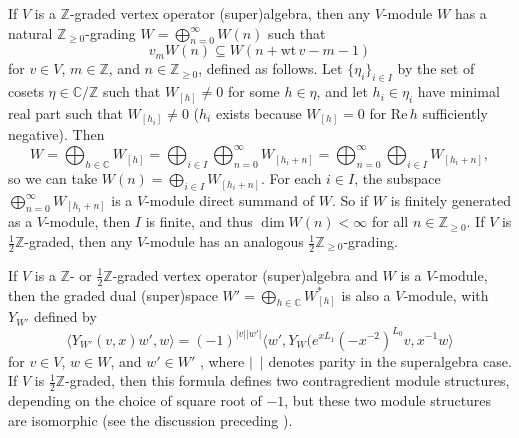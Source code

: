 \documentclass[11pt, reqno]{amsart}
\theoremstyle{definition}\newtheorem{defi}[thm]{Definition}
\theoremstyle{definition}\newtheorem{rem}[thm]{Remark}
\theoremstyle{definition}\newtheorem{exam}[thm]{Example}
\theoremstyle{definition}\newtheorem{assum}[thm]{Assumption}
\newcommand{\CC}{\mathbb{C}}
\newcommand{\ZZ}{\mathbb{Z}}
\begin{document}
If $V$ is a $\ZZ$-graded vertex operator (super)algebra, then any $V$-module $W$ has a natural $\ZZ_{\geq 0}$-grading $W=\bigoplus_{n=0}^\infty W(n)$ such that
\begin{equation*}
v_m W(n)\subseteq W(n+\mathrm{wt}\,v-m-1)
\end{equation*}
for $v\in V$, $m\in\ZZ$, and $n\in\ZZ_{\geq 0}$, defined as follows. Let $\lbrace\eta_i\rbrace_{i\in I}$ by the set of cosets $\eta\in\CC/\ZZ$ such that $W_{[h]}\neq 0$ for some $h\in\eta$, and let $h_i\in\eta_i$ have minimal real part such that $W_{[h_i]}\neq 0$ ($h_i$ exists because $W_{[h]}=0$ for $\mathrm{Re}\,h$ sufficiently negative). Then
\begin{equation*}
W=\bigoplus_{h\in\CC} W_{[h]} =\bigoplus_{i\in I}\bigoplus_{n=0}^\infty W_{[h_i+n]} =\bigoplus_{n=0}^\infty\bigoplus_{i\in I} W_{[h_i+n]},
\end{equation*}
so we can take $W(n)=\bigoplus_{i\in I} W_{[h_i+n]}$. For each $i\in I$, the subspace $\bigoplus_{n=0}^\infty W_{[h_i+n]}$ is a $V$-module direct summand of $W$. So if $W$ is finitely generated as a $V$-module, then $I$ is finite, and thus $\dim W(n)<\infty$ for all $n\in\ZZ_{\geq 0}$. If $V$ is $\frac{1}{2}\ZZ$-graded, then any $V$-module has an analogous $\frac{1}{2}\ZZ_{\geq 0}$-grading.

If $V$ is a $\ZZ$- or $\frac{1}{2}\ZZ$-graded vertex operator (super)algebra and $W$ is a $V$-module, then the graded dual (super)space $W'=\bigoplus_{h\in\CC} W_{[h]}^*$ is also a $V$-module, with $Y_{W'}$ defined by
\begin{equation*}
\langle Y_{W'}(v,x)w', w\rangle =(-1)^{\vert v\vert\vert w'\vert}\langle w', Y_W(e^{xL_1}(-x^{-2})^{L_0} v,x^{-1}w\rangle
\end{equation*}
for $v\in V$, $w\in W$, and $w'\in W'$ \cite{FHL}, where $\vert\,\,\,\vert$ denotes parity in the superalgebra case. If $V$ is $\frac{1}{2}\ZZ$-graded, then this formula defines two contragredient module structures, depending on the choice of square root of $-1$, but these two module structures are isomorphic (see the discussion preceding \cite[Remark 3.5]{CKM}).
\end{document}

